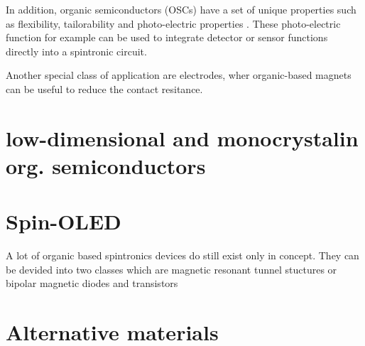 

In addition, organic semiconductors (OSCs) have a set of unique properties such as flexibility, tailorability and photo-electric properties \cite{appl-organic}.
These photo-electric function for example can be used to integrate detector or sensor functions directly into a spintronic circuit.

Another special class of application are electrodes, wher organic-based magnets can be useful to reduce the contact resitance.



\section{low-dimensional and monocrystalin org. semiconductors}
\label{sec:2D}

\section{Spin-OLED}
\label{sec:device}
A lot of organic based spintronics devices do still exist only in concept.
They can be devided into two classes which are magnetic resonant tunnel stuctures or bipolar magnetic diodes and transistors \cite{SC-spintronics}

\section{Alternative materials}
\label{sec:alternative}



